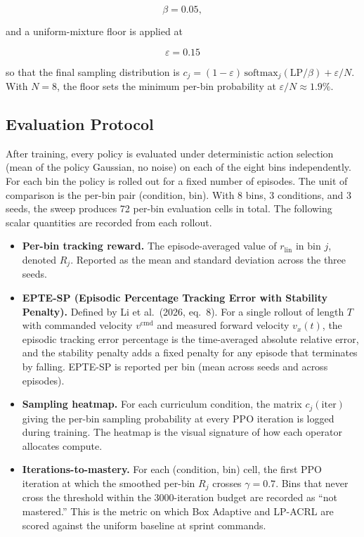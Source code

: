 \[
\beta = 0.05,
\]

and a uniform-mixture floor is applied at

\[
\varepsilon = 0.15
\]

so that the final sampling distribution is $c_j = (1 - \varepsilon)\, \mathrm{softmax}_j(\mathrm{LP}/\beta) + \varepsilon / N$. With $N = 8$, the floor sets the minimum per-bin probability at $\varepsilon / N \approx 1.9\%$.

\subsection{Evaluation Protocol}

After training, every policy is evaluated under deterministic action selection (mean of the policy Gaussian, no noise) on each of the eight bins independently. For each bin the policy is rolled out for a fixed number of episodes. The unit of comparison is the per-bin pair (condition, bin). With 8 bins, 3 conditions, and 3 seeds, the sweep produces 72 per-bin evaluation cells in total. The following scalar quantities are recorded from each rollout.

\begin{itemize}
  \item \textbf{Per-bin tracking reward.} The episode-averaged value of $r_{\mathrm{lin}}$ in bin $j$, denoted $R_j$. Reported as the mean and standard deviation across the three seeds.
  \item \textbf{EPTE-SP (Episodic Percentage Tracking Error with Stability Penalty).} Defined by Li et al.\ (2026, eq.\ 8). For a single rollout of length $T$ with commanded velocity $v^{\mathrm{cmd}}$ and measured forward velocity $v_x(t)$, the episodic tracking error percentage is the time-averaged absolute relative error, and the stability penalty adds a fixed penalty for any episode that terminates by falling. EPTE-SP is reported per bin (mean across seeds and across episodes).
  \item \textbf{Sampling heatmap.} For each curriculum condition, the matrix $c_j(\mathrm{iter})$ giving the per-bin sampling probability at every PPO iteration is logged during training. The heatmap is the visual signature of how each operator allocates compute.
  \item \textbf{Iterations-to-mastery.} For each (condition, bin) cell, the first PPO iteration at which the smoothed per-bin $R_j$ crosses $\gamma = 0.7$. Bins that never cross the threshold within the 3000-iteration budget are recorded as ``not mastered.'' This is the metric on which Box Adaptive and LP-ACRL are scored against the uniform baseline at sprint commands.
\end{itemize}

